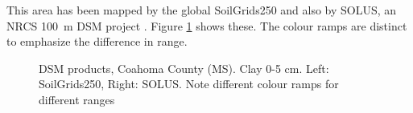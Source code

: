 \documentclass[soil, manuscript]{copernicus}
\begin{document}
\par
This area has been mapped by the global SoilGrids250 and also by SOLUS, an NRCS 100~m DSM project \citet{naumanSoilLandscapesUnited2024,naumanDataSoilLandscapes2024}.
%
Figure \ref{fig:coahoma_dsm} shows these. The colour ramps are distinct to emphasize the difference in range.

\begin{figure}
  \hfill
 \caption{DSM products, Coahoma County (MS). Clay 0-5 cm. Left: SoilGrids250, Right: SOLUS. Note different colour ramps for different ranges}
  \label{fig:coahoma_dsm}
\end{figure}
\end{document}
